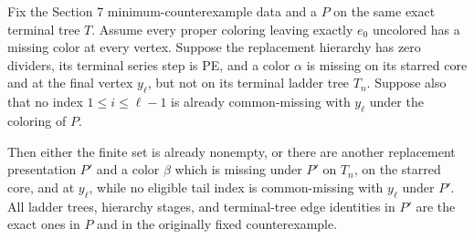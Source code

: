 \begin{lemma}
Fix the Section 7 minimum-counterexample data and a
 \(P\) on the same exact terminal
tree \(T\).  Assume every proper coloring leaving exactly \(e_0\) uncolored
has a missing color at every vertex.  Suppose the replacement hierarchy has
zero dividers, its terminal series step is PE, and a color \(\alpha\) is
missing on its starred core and at the final vertex \(y_\ell\), but not on
its terminal ladder tree \(T_n\).  Suppose also that no index
\(1\leq i\leq\ell-1\) is already common-missing with \(y_\ell\) under the
coloring of \(P\).

Then either the finite set
 is already nonempty, or
there are another replacement presentation \(P'\) and a color \(\beta\)
which is missing under \(P'\) on \(T_n\), on the starred core, and at
\(y_\ell\), while no eligible tail index is common-missing with \(y_\ell\)
under \(P'\).  All ladder trees, hierarchy stages, and terminal-tree edge
identities in \(P'\) are the exact ones in \(P\) and in the originally fixed
counterexample.
\end{lemma}
